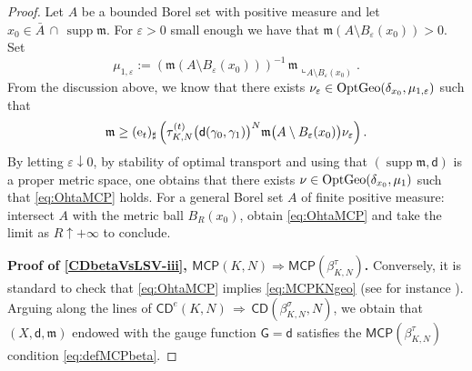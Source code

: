 \documentclass[11pt,a4paper]{article}
\theoremstyle{plain}
\theoremstyle{definition}
\theoremstyle{remark}
\numberwithin{equation}{section}
\DeclareMathOperator{\supp}{\mathrm{supp}}
\newcommand{\ve}{\varepsilon}
\newcommand{\CD}{\mathsf{CD}}
\newcommand{\MCP}{\mathsf{MCP}}
\newcommand{\OptGeo}{{\rm OptGeo}}
\newcommand{\mm}{\mathfrak m}
\newcommand{\ee}{{\rm e}}
\newcommand{\sfd}{\mathsf d}
\newcommand{\sfG}{\mathsf G}
\begin{document}
\begin{proof}
 Let $A$ be a bounded Borel set with positive measure and let $x_{0} \in  \bar{A}\, \cap\, \supp\mm$.  For $\ve>0$ small enough we have that $\mm(A\setminus B_{\ve}(x_{0}))>0$. Set 
\begin{equation}
\mu_{1,\ve}:= (\mm(A\setminus B_{\ve}(x_{0})))^{-1} \, \mm \llcorner_{A \setminus B_{\ve}(x_{0})}.
\end{equation} 
From the discussion above, we know that there exists  $\nu_\ve\in \OptGeo(\delta_{x_{0}}, \mu_{1,\ve})$ such that
\begin{equation}\label{eq:OhtaMCP2}
\mm   \geq  (\ee_{t})_{\sharp} \left(\tau_{K,N}^{(t)}\big(\sfd(\gamma_{0},\gamma_{1})\big)^{N} \mm\big(A \setminus B_{\ve}(x_{0})\big) \nu_\ve \right).\end{equation}
By letting  $\ve \downarrow 0$, by stability of optimal transport \cite[Thm.\@ 28.9]{Vil} and using that $(\supp\mm, \sfd)$ is a proper metric space, one obtains that there exists  $\nu\in \OptGeo(\delta_{x_{0}}, \mu_{1})$ such that \eqref{eq:OhtaMCP} holds.  For a general Borel set $A$ of finite positive measure: intersect $A$ with the metric ball $B_R(x_0)$, obtain \eqref{eq:OhtaMCP} and take the limit as $R\uparrow +\infty$ to conclude.   


\textbf{Proof of \ref{CDbetaVsLSV-iii}, $ \MCP(K,N) \Rightarrow \MCP(\beta_{K,N}^{\tau})$.} Conversely,  it is standard  to check that \eqref{eq:OhtaMCP} implies \eqref{eq:MCPKNgeo}
 (see for instance \cite[App.\@ A]{CavaMondCCM}). Arguing along the lines of  $\CD^{e}(K,N) \, \Rightarrow\, \CD (\beta_{K,N}^{\sigma}, N)$, we obtain that $(X,\sfd,\mm)$ endowed with the gauge function $\sfG=\sfd$ satisfies the $\MCP(\beta_{K,N}^{\tau})$ condition \eqref{eq:defMCPbeta}.
\end{proof}
\end{document}
